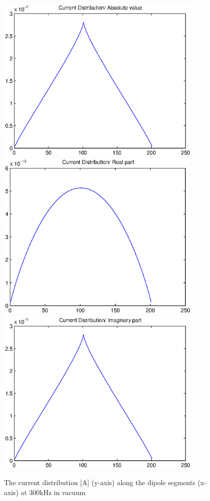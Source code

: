 \documentclass[a4paper,11pt]{thesis}
\begin{document}
\begin{figure}
 \begin{center}
\includegraphics[width=10.0cm]{DissPics/curr_abs_3kh.eps}
 \includegraphics[width=10.0cm]{DissPics/curr_re_3kh.eps}
 \includegraphics[width=10.0cm]{DissPics/curr_im_3kh.eps}\end{center}
  \caption{The current distribution [A] (y-axis) along the dipole segments (x-axis) at 300kHz in vacuum}\label{fig:curr_3kh_vac}
\end{figure}
\end{document}
